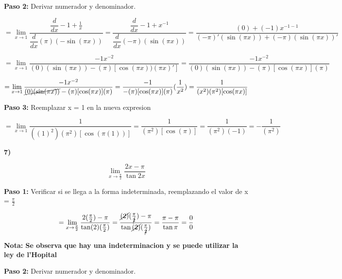\documentclass[12pt,a4paper]{article}
\begin{document}
\newpage

\textbf{Paso 2:}
\vspace{0.2cm}
Derivar numerador y denominador.

\[
= \lim_{x \to 1} \frac{\dfrac{d}{dx} -1+\frac{1}{x}}{\dfrac{d}{dx} ( \pi)(-\sin(\pi x))}=  \frac{\dfrac{d}{dx} -1+ x^{-1}}{\dfrac{d}{dx} (- \pi)(\sin(\pi x))}= \frac{(0)+ (-1)x^{-1-1}}{(- \pi)'(\sin(\pi x))+ (- \pi)(\sin(\pi x))'}
\]

\[
= \lim_{x \to 1} \frac{-1x^{-2}}{(0)(\sin(\pi x))- ( \pi)[\cos (\pi x))(\pi x)']} = \frac{-1x^{-2}}{(0)(\sin(\pi x))- ( \pi)[\cos (\pi x)](\pi)}
\]

\[
= \lim_{x \to 1} \frac{-1x^{-2}}{\cancel{(0)(\sin(\pi x))}- ( \pi)[\cos (\pi x)](\pi)}= \frac{-1}{- ( \pi)[\cos (\pi x)](\pi)}(\frac{1}{x^2})= \frac{1}{(x^2)( \pi ^2)[\cos (\pi x)]} 
\]



\textbf{Paso 3:}
\vspace{0.2cm}
Reemplazar x = 1 en la nueva expresion

\[
= \lim_{x \to 1} \frac{1}{((1)^2)( \pi ^2)[\cos (\pi (1))]}= \frac{1}{( \pi ^2)[\cos (\pi)]}= \frac{1}{( \pi ^2)(-1)}= - \frac{1}{(\pi ^2)}
\]


\vspace{0.2cm}
\newpage


\textbf{7)}

\[
\lim_{x \to \frac{\pi}{2}} \frac{2x - \pi}{\tan 2x} 
\]

\vspace{0.2cm}

\textbf{Paso 1:}
\vspace{0.2cm}
Verificar si se llega a la forma indeterminada, reemplazando el valor de x = $\frac{\pi}{2}$

\[
= \lim_{x \to \frac{\pi}{2}} \frac{2(\frac{\pi}{2}) - \pi}{\tan (2)(\frac{\pi}{2})}= \frac{\cancel{(2)}(\frac{\pi}{\cancel{2}}) - \pi}{\tan \cancel{(2)}(\frac{\pi}{\cancel{2}})}= \frac{\pi - \pi}{\tan \pi}= \frac{0}{0}
\]


\vspace{0.2cm}

\textbf{Nota: Se observa que hay una indeterminacion y se puede utilizar la ley de l'Hopital }

\vspace{0.5cm}

\textbf{Paso 2:}
\vspace{0.2cm}
Derivar numerador y denominador.
\end{document}

